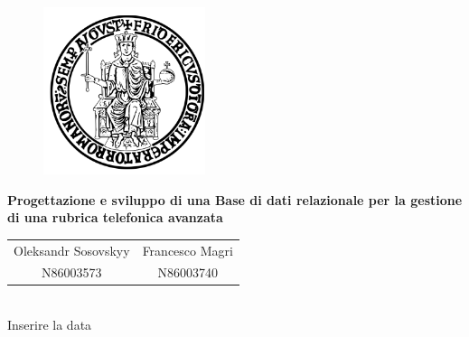 \documentclass[a4paper,11pt]{report}
\begin{document}
\begin{figure}[htbp!]
\begin{center}
\includegraphics[width=.35\textwidth]{Immagini/FedericoII.png}
\end{center}
\end{figure}

\begin{center}
{\Huge\bfseries\noindent 
Progettazione e sviluppo di una Base di dati relazionale per la gestione di una rubrica telefonica avanzata}
\end{center}  


\begin{center}
\begin{tabular}{cc}
Oleksandr Sosovskyy & Francesco Magri \\
N86003573 & N86003740 \\

\end{tabular}
\\
Inserire la data
\end{center}

\newpage

\tableofcontents
    



\end{document}

